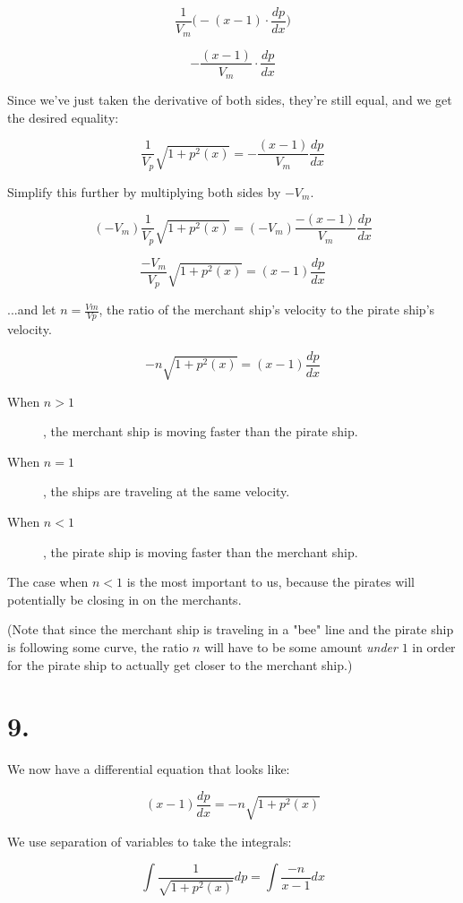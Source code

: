 \documentclass[11pt]{report}
\begin{document}
$$
\frac{1}{V_m}
\Big(
	-
	(x-1) \cdot \frac{dp}{dx}
\Big)
$$

$$
-\frac{(x-1)}{V_m}
\cdot \frac{dp}{dx}
$$

Since we've just taken the derivative of both sides, they're still equal, and
we get the desired equality:

$$
\frac{1}{V_p} \sqrt{1 + p^2(x)}
=
-\frac{(x-1)}{V_m} \frac{dp}{dx}
$$

Simplify this further by multiplying both sides by $-V_m$.

$$
(-V_m)
\frac{1}{V_p} \sqrt{1 + p^2(x)}
=
(-V_m)
\frac{-(x-1)}{V_m} \frac{dp}{dx}
$$

$$
\frac{-V_m}{V_p} \sqrt{1 + p^2(x)}
=
(x-1) \frac{dp}{dx}
$$

...and let $n = \frac{Vm}{Vp}$, the ratio of the
merchant ship's velocity to the pirate ship's velocity.

$$
-n \sqrt{1 + p^2(x)}
=
(x-1) \frac{dp}{dx}
$$

\begin{description}

	\item[When $n > 1$], the merchant ship is moving faster than the pirate ship.
	\item[When $n = 1$], the ships are traveling at the same velocity.
	\item[When $n < 1$], the pirate ship is moving faster than the
merchant ship.
\end{description}

The case when $n < 1$ is the most important to us, because the pirates will potentially be closing in on the merchants.

(Note that since the merchant ship is traveling in a "bee" line and the pirate ship is 
following some curve, the ratio $n$ will have to be some amount \emph{under} $1$ in order
for the pirate ship to actually get closer to the merchant ship.)

\section*{9.}

We now have a differential equation that looks like:

$$
(x-1) \frac{dp}{dx}
=
-n \sqrt{1 + p^2(x)}
$$

We use separation of variables to take the integrals:

$$
\int \frac{1}{\sqrt{1 + p^2(x)}} dp
=
\int \frac{-n}{x-1} dx
$$
\end{document}
